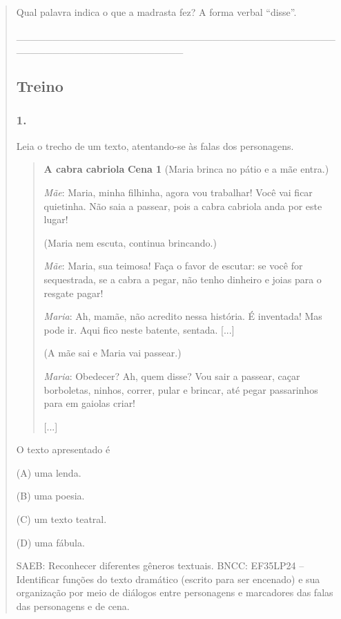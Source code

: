 \begin{quote}
Qual palavra indica o que a madrasta fez? A forma verbal ``disse''.

\_\_\_\_\_\_\_\_\_\_\_\_\_\_\_\_\_\_\_\_\_\_\_\_\_\_\_\_\_\_\_\_\_\_\_\_\_\_\_\_\_\_\_\_\_\_\_\_\_\_\_\_\_\_\_\_\_\_\_\_\_\_\_\_\_\_\_

\subsection{Treino}\label{treino-1}

\subsubsection{1. }\label{section-29}

Leia o trecho de um texto, atentando-se às falas dos personagens.

\begin{quote}
\textbf{A cabra cabriola}
\textbf{Cena 1}
(Maria brinca no pátio e a mãe entra.)

\emph{Mãe}: Maria, minha filhinha, agora vou trabalhar! Você vai ficar
quietinha. Não saia a passear, pois a cabra cabriola anda por este
lugar!

(Maria nem escuta, continua brincando.)

\emph{Mãe}: Maria, sua teimosa! Faça o favor de escutar: se você for
sequestrada, se a cabra a pegar, não tenho dinheiro e joias para o
resgate pagar!

\emph{Maria}: Ah, mamãe, não acredito nessa história. É inventada! Mas
pode ir. Aqui fico neste batente, sentada. {[}...{]}

(A mãe sai e Maria vai passear.)

\emph{Maria}: Obedecer? Ah, quem disse? Vou sair a passear, caçar
borboletas, ninhos, correr, pular e brincar, até pegar passarinhos para
em gaiolas criar!

{[}...{]}

\end{quote}

O texto apresentado é

(A) uma lenda.

(B) uma poesia.

(C) um texto teatral.

(D) uma fábula.

SAEB: Reconhecer diferentes gêneros textuais.
BNCC: EF35LP24 -- Identificar funções do texto dramático (escrito para ser
encenado) e sua organização por meio de diálogos entre personagens e
marcadores das falas das personagens e de cena.


\end{quote}
